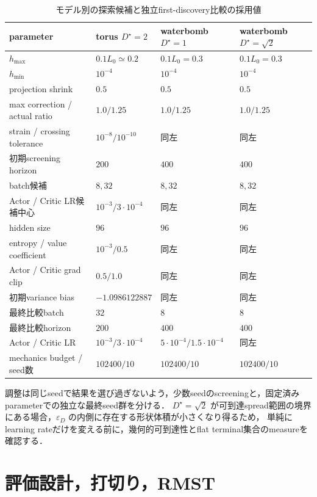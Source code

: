 \documentclass[a4paper,11pt]{ltjsarticle}
\begin{document}
\begin{table}[htbp]
\centering
\caption{モデル別の探索候補と独立first-discovery比較の採用値}
\label{tab:search-hyper}
\begin{tabularx}{\textwidth}{>{\raggedright\arraybackslash}p{39mm}>{\centering\arraybackslash}X>{\centering\arraybackslash}X>{\centering\arraybackslash}X}
\toprule
parameter & torus $D^\star=2$ & waterbomb $D^\star=1$ & waterbomb $D^\star=\sqrt2$ \\
\midrule
$h_{\max}$ & $0.1L_0\simeq0.2$ & $0.1L_0=0.3$ & $0.1L_0=0.3$ \\
$h_{\min}$ & $10^{-4}$ & $10^{-4}$ & $10^{-4}$ \\
projection shrink & $0.5$ & $0.5$ & $0.5$ \\
max correction / actual ratio & $1.0/1.25$ & $1.0/1.25$ & $1.0/1.25$ \\
strain / crossing tolerance & $10^{-8}/10^{-10}$ & 同左 & 同左 \\
初期screening horizon & $200$ & $400$ & $400$ \\
batch候補 & $8,32$ & $8,32$ & $8,32$ \\
Actor / Critic LR候補中心 & $10^{-3}/3\cdot10^{-4}$ & 同左 & 同左 \\
hidden size & $96$ & $96$ & $96$ \\
entropy / value coefficient & $10^{-3}/0.5$ & 同左 & 同左 \\
Actor / Critic grad clip & $0.5/1.0$ & 同左 & 同左 \\
初期variance bias & $-1.0986122887$ & 同左 & 同左 \\
最終比較batch & $32$ & $8$ & $8$ \\
最終比較horizon & $200$ & $400$ & $400$ \\
Actor / Critic LR & $10^{-3}/3\cdot10^{-4}$ & $5\cdot10^{-4}/1.5\cdot10^{-4}$ & 同左 \\
mechanics budget / seed数 & $102400/10$ & $102400/10$ & $102400/10$ \\
\bottomrule
\end{tabularx}
\end{table}

調整は同じseedで結果を選び過ぎないよう，少数seedのscreeningと，固定済みparameterでの独立な最終seed群を分ける．
$D^\star=\sqrt2$ が可到達spread範囲の境界にある場合，$\varepsilon_D$ の内側に存在する形状体積が小さくなり得るため，
単純にlearning rateだけを変える前に，幾何的可到達性とflat terminal集合のmeasureを確認する．

\section{評価設計，打切り，RMST}
\label{sec:evaluation}
\end{document}
